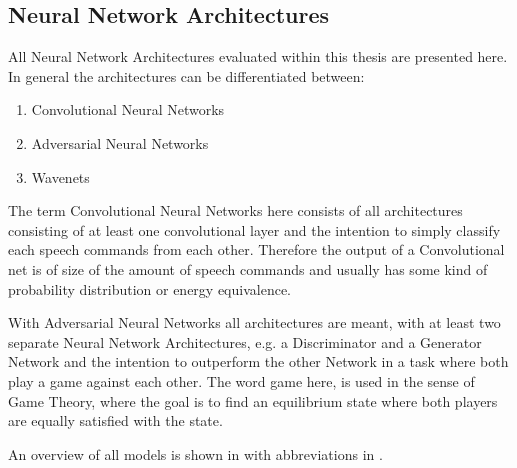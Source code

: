 \subsection{Neural Network Architectures}\label{sec:nn_arch}
All Neural Network Architectures evaluated within this thesis are presented here.
In general the architectures can be differentiated between:
\begin{enumerate}
	\item Convolutional Neural Networks
	\item Adversarial Neural Networks
	\item Wavenets
\end{enumerate}
The term Convolutional Neural Networks here consists of all architectures consisting of at least one convolutional layer and the intention to simply classify each speech commands from each other. 
Therefore the output of a Convolutional net is of size of the amount of speech commands and usually has some kind of probability distribution or energy equivalence.

With Adversarial Neural Networks all architectures are meant, with at least two separate Neural Network Architectures, e.g. a Discriminator and a Generator Network and the intention to outperform the other Network in a task where both play a game against each other.
The word game here, is used in the sense of Game Theory, where the goal is to find an equilibrium state where both players are equally satisfied with the state.

An overview of all models is shown in  with abbreviations in .

